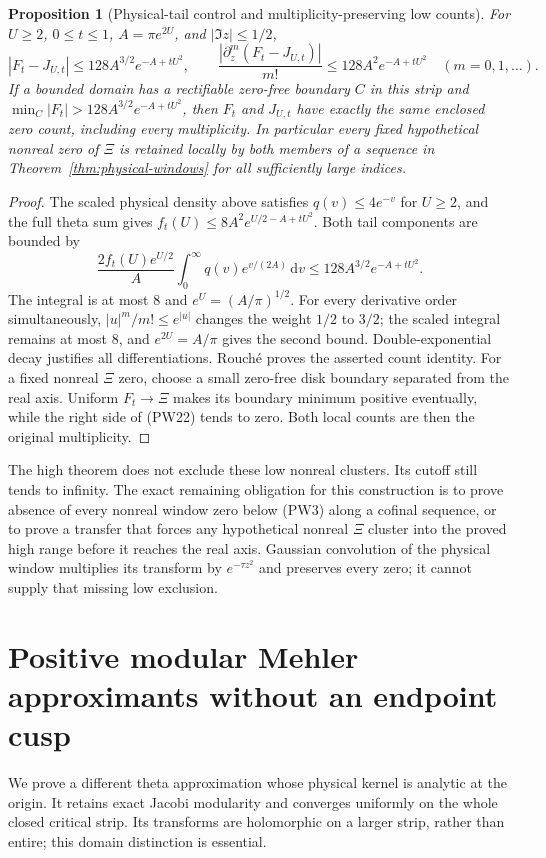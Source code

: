 \documentclass[11pt]{article}
\newtheorem{proposition}[theorem]{Proposition}
\theoremstyle{remark}\newtheorem{remark}[theorem]{Remark}
\newcommand{\dd}{\,\mathrm d}
\begin{document}
\begin{proposition}[Physical-tail control and multiplicity-preserving low counts]
\label{prop:physical-tail-low-count}
For $U\ge2$, $0\le t\le1$, $A=\pi e^{2U}$, and $|\Im z|\le1/2$,
\[
 |F_t-J_{U,t}|\le128A^{3/2}e^{-A+tU^2},\qquad
 \frac{|\partial_z^m(F_t-J_{U,t})|}{m!}
       \le128A^2e^{-A+tU^2}\quad(m=0,1,\ldots).     \tag{PW22}
\]
If a bounded domain has a rectifiable zero-free boundary $C$ in this
strip and $\min_C|F_t|>128A^{3/2}e^{-A+tU^2}$, then $F_t$ and
$J_{U,t}$ have exactly the same enclosed zero count, including
every multiplicity. In particular every fixed hypothetical nonreal
zero of $\Xi$ is retained locally by both members of a sequence in
Theorem~\ref{thm:physical-windows} for all sufficiently large indices.
\end{proposition}
\begin{proof}
The scaled physical density above satisfies $q(v)\le4e^{-v}$ for
$U\ge2$, and the full theta sum gives
$f_t(U)\le8A^2e^{U/2-A+tU^2}$. Both tail components are bounded by
\[
 \frac{2f_t(U)e^{U/2}}A
       \int_0^\infty q(v)e^{v/(2A)}\dd v
       \le128A^{3/2}e^{-A+tU^2}.
\]
The integral is at most $8$ and $e^U=(A/\pi)^{1/2}$.
For every derivative order simultaneously, $|u|^m/m!\le e^{|u|}$
changes the weight $1/2$ to $3/2$; the scaled integral remains
at most $8$, and $e^{2U}=A/\pi$ gives the second bound.
Double-exponential decay justifies all differentiations.
Rouch\'e proves the asserted count identity. For a fixed nonreal
$\Xi$ zero, choose a small zero-free disk boundary separated from
the real axis. Uniform $F_t\to\Xi$ makes its boundary minimum
positive eventually, while the right side of (PW22) tends to zero.
Both local counts are then the original multiplicity.
\end{proof}

The high theorem does not exclude these low nonreal clusters. Its
cutoff still tends to infinity. The exact remaining obligation for
this construction is to prove absence of every nonreal window zero
below (PW3) along a cofinal sequence, or to prove a transfer that
forces any hypothetical nonreal $\Xi$ cluster into the proved high
range before it reaches the real axis. Gaussian convolution of the
physical window multiplies its transform by $e^{-\tau z^2}$ and
preserves every zero; it cannot supply that missing low exclusion.

\section{Positive modular Mehler approximants without an endpoint cusp}
\label{sec:mehler}
We prove a different theta approximation whose physical kernel is
analytic at the origin. It retains exact Jacobi modularity and converges
uniformly on the whole closed critical strip. Its transforms are
holomorphic on a larger strip, rather than entire; this domain distinction
is essential.
\end{document}
